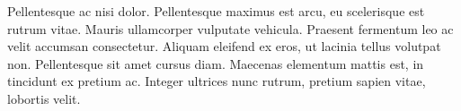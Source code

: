 \documentclass[10pt, a4paper, twocolumn]{article} %
\begin{document}
Pellentesque ac nisi dolor. Pellentesque maximus est arcu, eu scelerisque est rutrum vitae. Mauris ullamcorper vulputate vehicula. Praesent fermentum leo ac velit accumsan consectetur. Aliquam eleifend ex eros, ut lacinia tellus volutpat non. Pellentesque sit amet cursus diam. Maecenas elementum mattis est, in tincidunt ex pretium ac. Integer ultrices nunc rutrum, pretium sapien vitae, lobortis velit.


\printbibliography[title={Bibliography}] %

\end{document}
